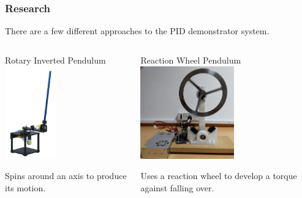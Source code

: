 \documentclass[aspectratio=169]{beamer}
\begin{document}
\begin{frame}
    \frametitle{Research}

    There are a few different approaches to the PID demonstrator system.

    \begin{columns}

    \begin{column}{0.48\textwidth}
        \begin{block}{Rotary Inverted Pendulum}
             \includegraphics[height=4cm]{RotaryInvertedPendulum}
        \end{block}
        Spins around an axis to produce its motion.
    \end{column}

    \begin{column}{0.48\textwidth}
        \begin{block}{Reaction Wheel Pendulum}
                \includegraphics[height=4cm]{ReactionWheel}
        \end{block}
        Uses a reaction wheel to develop a torque against falling over.
    \end{column}
\end{columns}
\end{frame}
\end{document}
